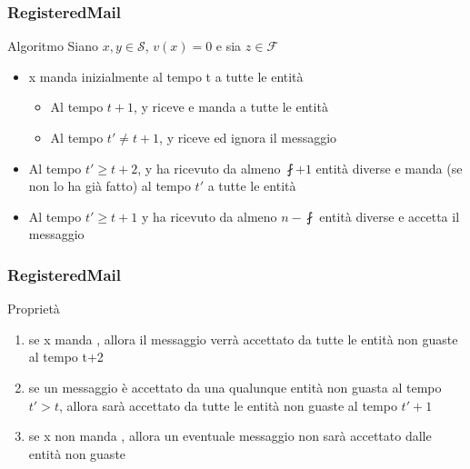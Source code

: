 		\begin{frame}
			\frametitle{RegisteredMail}	
			\begin{block}{Algoritmo}
				Siano $x,y \in \mathcal{S}$, $v(x) = 0$ e sia $z \in \mathcal{F}$
				\begin{itemize}
					\item x manda inizialmente al tempo t  a tutte le entità
					\begin{itemize}
						\footnotesize
						\item Al tempo $t+1$, y riceve  e manda  a tutte le entità
						\item Al tempo $t' \neq t+1$, y riceve  ed ignora il messaggio
					\end{itemize}
					\item Al tempo $t' \geq t+2$, y ha ricevuto   da almeno $\fint + 1$ entità diverse e manda  (se non lo ha già fatto) al tempo $t'$ a tutte le entità
					\item Al tempo $t' \geq t+1$ y ha ricevuto  da almeno $n - \fint$ entità diverse e accetta il messaggio
				\end{itemize}
			\end{block}			
		\end{frame}
	
		\begin{frame}
			\frametitle{RegisteredMail}	
			\begin{block}{Proprietà}
				\begin{enumerate}
					\item se x manda , allora il messaggio verrà accettato da tutte le entità non guaste al tempo t+2
					\item se un messaggio è accettato da una qualunque entità non guasta al tempo $t' > t$, allora sarà accettato da tutte le entità non guaste al tempo $t' + 1$
					\item se x non manda , allora un eventuale messaggio  non sarà accettato dalle entità non guaste
				\end{enumerate}
			\end{block}		
		\end{frame}
	
